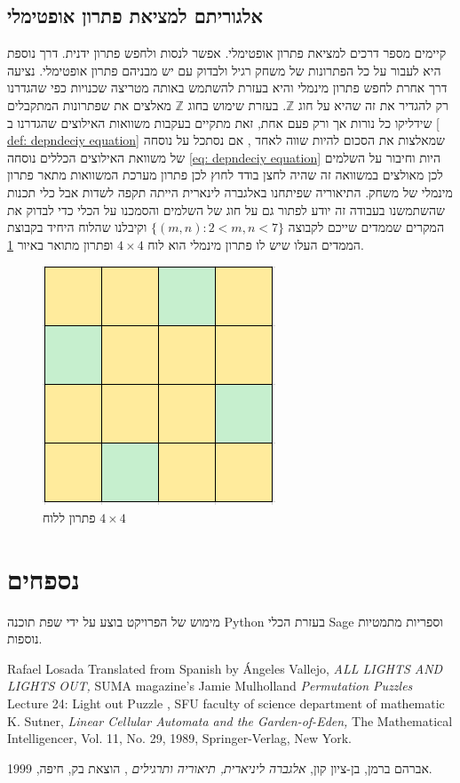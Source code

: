\documentclass[12pt,leqno]{article}
\theoremstyle{theoremdd}
\begin{document}
\subsection{אלגוריתם למציאת פתרון אופטימלי}
קיימים מספר דרכים למציאת פתרון אופטימלי.
אפשר לנסות ולחפש פתרון ידנית.
דרך נוספת היא לעבור על כל הפתרונות של משחק רגיל ולבדוק עם יש מבניהם פתרון 
אופטימלי.
נציעה דרך אחרת לחפש פתרון 
מינמלי
והיא בעזרת להשתמש באותה מטריצה שכנויות כפי שהגדרנו רק להגדיר 
את זה שהיא על חוג 
$\mathbb{Z}$.
בעזרת שימוש בחוג 
$\mathbb{Z}$
מאלצים את שפתרונות המתקבלים
שידליקו כל נורות אך ורק פעם אחת,
זאת מתקיים בעקבות 
משוואות האילוצים שהגדרנו ב
\ref{ def: depndeciy equation}
שמאלצות את הסכום להיות שווה לאחד
,
אם נסתכל על נוסחה של משוואת האילוצים הכללים 
נוסחה
\ref{eq: depndeciy equation}
היות וחיבור על השלמים לכן 
מאולצים במשוואה זה שהיה לחצן בודד לחוץ 
לכן פתרון מערכת המשוואות מתאר פתרון 
מינמלי של משחק.
התיאוריה שפיתחנו באלגברה לינארית הייתה תקפה לשדות 
אבל כלי תכנות שהשתמשנו
בעבודה זה יודע לפתור גם על חוג של השלמים 
והסמכנו על הכלי כדי לבדוק את המקרים
שממדים שייכם לקבוצה 
$\{ (m,n) : 2 < m,n <7 \}$
וקיבלנו שהלוח
היחיד בקבוצת הממדים העלו שיש לו פתרון מינמלי 
הוא
לוח 
$4 \times 4$
ופתרון מתואר באיור 
\ref{fig:4x4_have_min_sol}.

\begin{figure}[ht]
    \caption{פתרון ללוח 
    $4 \times 4$}
    \label{fig:4x4_have_min_sol}
    \centering
    \includegraphics[width=.3\textwidth,keepaspectratio]{images/4x4_min_sol.PNG}
\end{figure}

\newpage
\section{נספחים}
מימוש של הפרויקט בוצע על ידי 
שפת תוכנה 
{Python}
בעזרת הכלי
{Sage}
וספריות מתמטיות נוספות.

\newpage
\begin{thebibliography}{99}
\begin{english}
Rafael Losada
Translated from Spanish by Ángeles Vallejo,
\emph{
    ALL LIGHTS AND LIGHTS OUT,
}
SUMA magazine’s 
Jamie Mulholland
\emph{
    Permutation Puzzles
}
Lecture 24: Light out Puzzle , SFU faculty of science department of mathematic
K. Sutner, \emph{Linear Cellular Automata and the Garden-of-Eden,} The Mathematical Intelligencer, Vol. 11, No. 29, 1989, Springer-Verlag, New York.		
\end{english}
אברהם ברמן, בן-ציון קון, 
\emph{
אלגברה ליניארית, תיאוריה ותרגילים
}
, הוצאת בק, חיפה, 1999.
\end{thebibliography}
\end{document}
